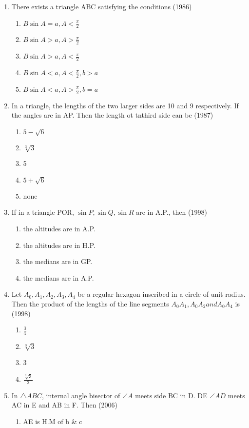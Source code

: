\documentclass[12pt]{article}
\begin{document}
\begin{enumerate}
\item  There exists a triangle ABC satisfying the conditions (1986)
\begin{enumerate}
\item $B \sin A=a,A<\frac{\pi}{2}$
\item $B \sin A>a,A>\frac{\pi}{2}$
\item $B \sin A>a,A<\frac{\pi}{2}$
\item $B \sin A<a,A<\frac{\pi}{2},b>a$
\item $B \sin A<a,A>\frac{\pi}{2},b=a$
\end{enumerate}
\item In a triangle, the lengths of the two larger sides are 10 and 9 respectively. If the angles are in AP. Then the length ot tnthird side can be (1987)
\begin{enumerate}
\item $5-\sqrt{6}$
\item $\sqrt[3]{3}$
\item 5
\item $5+\sqrt{6}$
\item none
\end{enumerate}
\item If in a triangle POR, $\sin P,\sin Q,\sin R$ are in A.P., then (1998)
\begin{enumerate}
\item  the altitudes are in A.P. 
\item the altitudes are in H.P.
\item the medians are in GP. 
\item the medians are in A.P.
\end{enumerate}
\item Let $A_0,A_1,A_2,A_3,A_4$ be a regular hexagon inscribed in a circle of unit radius. Then the product of the lengths of the line segments $A_0A_1,A_0A_2 and A_0A_4$ is (1998)
\begin{enumerate}
\item $\frac{3}{4}$
\item $\sqrt[3]{3}$
\item 3 
\item $\frac{\sqrt[3]{3}}{2}$
\end{enumerate}
\item In $\triangle ABC$, internal angle bisector of $\angle A$ meets side BC in D.
DE $\angle AD$ meets AC in E and AB in F. Then (2006)
\begin{enumerate}
\item AE is H.M of b $\&$ c

\end{enumerate}
\end{enumerate}
\end{document}
